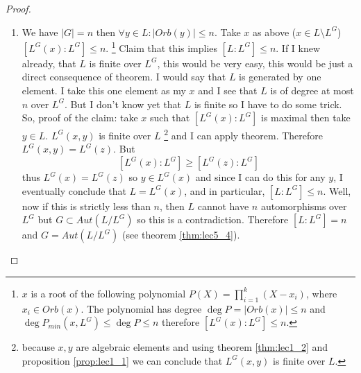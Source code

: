 \begin{theorem}[Artin]
\begin{proof}
\begin{enumerate}
      is $G$-invariant
      \footnote{
        I.e. $\forall g \in G: g\left(P\left(X\right)\right) =
        P\left(X\right)$
      }
      . $G$ just permutes  the $x_i$, it permutes the factors of these
      polynomial, 
      so the polynomial is $G$-invariant. Therefore its coefficients are
      $G$-invariant and as result $P \in L^G\left[X\right]$ by
      definition \ref{def:setinvariants}. $L^G$ is a field of $G$
      invariants, and it is 
      separable. $P$ is separable, 
      because all $x_i$ are distinct ( there are distinct elements of the
      orbit ). And $L$ is splitting field of $P$, therefore $L$ is a
       over $L^G$ by the
       definition.
    \item We have $\left|G\right| = n$ then
      $\forall y \in L: \left|Orb\left(y\right)\right| \le n$. Take
      $x$ as above ($x \in L \setminus L^G$)
      $\left[L^G\left(x\right): L^G\right] \le n$.
      \footnote{
        $x$ is a root of the following polynomial $P\left(X\right) =
        \prod_{i=1}^k\left(X - x_i\right)$, where $x_i \in
        Orb(x)$. The polynomial has degree $\deg P =
        \left|Orb(x)\right| \le n$ and
        $\deg P_{min}\left(x, L^G\right) \le \deg P \le n$ therefore
        $\left[L^G\left(x\right): L^G\right] \le n$.
      }
      Claim that this
      implies $\left[L:L^G\right] \le n$. If I knew already, that $L$ is
      finite over $L^G$, this would be very easy, this would be just a
      direct consequence of  theorem. I
      would say that $L$ is generated by one element. I take this one element as
      my $x$ and I see that $L$ is of degree at most $n$ over $L^G$. But I
      don't know yet that $L$ is finite so I have to do some trick. So,
      proof of the claim:  take $x$ such that
      $\left[L^G\left(x\right):L^G\right]$ is maximal then take $y \in
      L$. $L^G\left(x,y\right)$ is finite over $L$
      \footnote{
        because $x,y$ are algebraic elements and using theorem
        \ref{thm:lec1_2} and proposition \ref{prop:lec1_1} we can
        conclude that $L^G\left(x,y\right)$ is finite over $L$.
      }
      and I can apply
       theorem. Therefore
      $L^G\left(x,y\right) = L^G\left(z\right)$. But
      \[
      \left[L^G\left(x\right):L^G\right] \ge
      \left[L^G\left(z\right):L^G\right]
      \]
      thus $L^G\left(x\right) = L^G\left(z\right)$ so
      $y \in L^G\left(x\right)$ and since I can do this for any $y$, I
      eventually conclude that $L = L^G\left(x\right)$, and in
      particular, $\left[L: L^G\right] \le n$. Well, now if this is
      strictly less than $n$, then $L$ cannot have $n$ automorphisms
      over $L^G$ but $G \subset Aut\left(L/L^G\right)$ so this is a
      contradiction. Therefore $\left[L: L^G\right] = n$ and
      $G = Aut\left(L/L^G\right)$ (see theorem \ref{thm:lec5_4}).
    \end{enumerate}
  \end{proof}
  \label{thm:artin}
\end{theorem}
